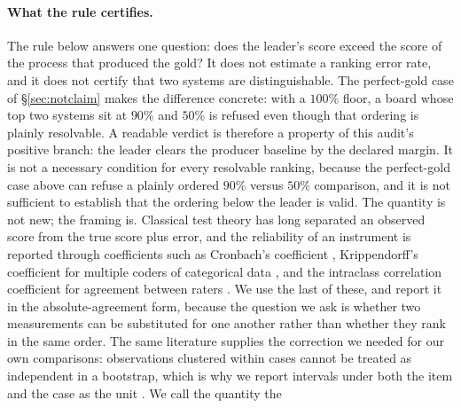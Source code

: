 \documentclass{article}
\begin{document}
\paragraph{What the rule certifies.} The rule below answers one question: does the leader's score exceed the score of the process that produced the gold? It does not estimate a ranking error rate, and it does not certify that two systems are distinguishable. The perfect-gold case of \S\ref{sec:notclaim} makes the difference concrete: with a $100\%$ floor, a board whose top two systems sit at $90\%$ and $50\%$ is refused even though that ordering is plainly resolvable. A readable verdict is therefore a property of this audit's positive branch: the leader clears the producer baseline by the declared margin. It is not a necessary condition for every resolvable ranking, because the perfect-gold case above can refuse a plainly ordered $90\%$ versus $50\%$ comparison, and it is not sufficient to establish that the ordering below the leader is valid. The quantity is not new; the framing is. Classical test theory has long separated an observed score from the true score plus error, and the reliability of an instrument is reported through coefficients such as Cronbach's coefficient \cite{cronbach1951}, Krippendorff's coefficient for multiple coders of categorical data \cite{krippendorff2004}, and the intraclass correlation coefficient for agreement between raters \cite{shroutfleiss1979,kooli2016}. We use the last of these, and report it in the absolute-agreement form, because the question we ask is whether two measurements can be substituted for one another rather than whether they rank in the same order. The same literature supplies the correction we needed for our own comparisons: observations clustered within cases cannot be treated as independent in a bootstrap, which is why we report intervals under both the item and the case as the unit \cite{camerongelbachmiller2007}. We call the quantity the
\end{document}
